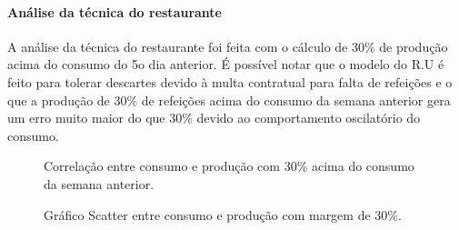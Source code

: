 \documentclass[	12pt, Times, openright, twoside, a4paper, english, brazil]{abntex2}
\begin{document}
    	    \paragraph{Análise da técnica do restaurante}
    	        A análise da técnica do restaurante foi feita com o cálculo de 30\% de produção acima do consumo do 5o dia anterior.
    	        É possível notar que o modelo do R.U é feito para tolerar descartes devido à multa contratual para falta de refeições e o que a produção de 30\% de refeições acima do consumo da semana anterior gera um erro muito maior do que 30\% devido ao comportamento oscilatório do consumo.
    	         \begin{figure}[!ht]
                	\caption{Correlação entre consumo e produção com 30\% acima do consumo da semana anterior. \label{fig:case1_ru_pred.png} }
                \end{figure}
                \begin{figure}[!ht]
                	\caption{Gráfico Scatter entre consumo e produção com margem de 30\%. \label{fig:case1_ru_pred_scatter} }
                \end{figure}
\end{document}
